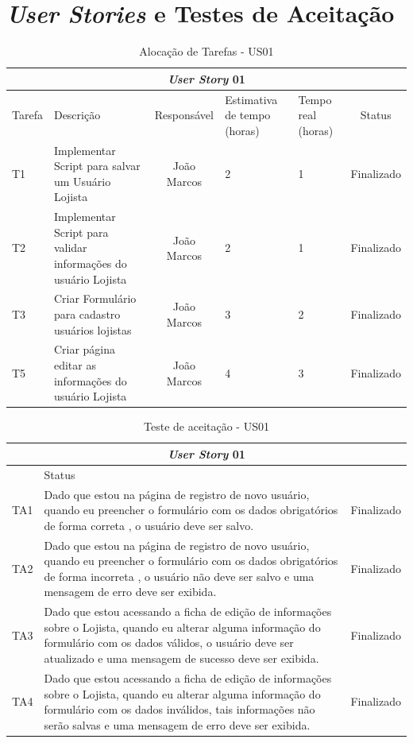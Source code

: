 \documentclass[a4paper,12pt]{monografia}
\begin{document}

\chapter{\textit{User Stories} e Testes de Aceitação} %
\label{app:user_stories_e_testes_de_aceitacao}

\begin{longtable}{|p{1.5cm}|p{3.5cm}|c|p{2cm}|p{2cm}|c|}
\caption{Alocação de Tarefas - US01}
\label{quadro:tat-us03}
\hline
\multicolumn{6}{|c|}{\textbf{\textit{User Story} 01}}\\
\hline		
\rowcolor{ballblue}
Tarefa & Descrição & Responsável & Estimativa de tempo (horas) & Tempo real (horas) & Status\\
\hline
T1 & Implementar Script para salvar um Usuário Lojista & João Marcos & 2 & 1 & Finalizado\\
\hline
T2 & Implementar Script para validar informações do usuário Lojista & João Marcos & 2 & 1 & Finalizado\\
\hline
T3 & Criar Formulário para cadastro usuários lojistas & João Marcos & 3 & 2 & Finalizado\\	
\hline
T5 & Criar página editar as informações do usuário Lojista & João Marcos & 4 & 3 & Finalizado\\	
\hline
\end{longtable}

\begin{longtable}{|l|p{11.8cm}|c|}
\caption{Teste de aceitação - US01}
\label{quadro:teste-aceitacao-us01}
\hline
\multicolumn{3}{|c|}{\textbf{\textit{User Story} 01}}\\
\hline		
\rowcolor{ballblue}
\multicolumn{2}{|c|}{Testes de aceitação} & Status\\	
\hline
TA1 & Dado que estou na página de registro de novo usuário, quando eu preencher o formulário com os dados obrigatórios de forma correta , o usuário deve ser salvo.   & Finalizado\\
\hline
TA2 & Dado que estou na página de registro de novo usuário, quando eu preencher o formulário com os dados obrigatórios de forma incorreta , o usuário não deve ser salvo e uma mensagem de erro deve ser exibida.   & Finalizado\\
\hline
TA3 & Dado que estou acessando a ficha de edição de informações sobre o Lojista, quando eu alterar alguma informação do formulário com os dados válidos, o usuário deve ser atualizado e uma mensagem de sucesso deve ser exibida.   & Finalizado\\
\hline
TA4 & Dado que estou acessando a ficha de edição de informações sobre o Lojista, quando eu alterar alguma informação do formulário com os dados inválidos, tais informações não serão salvas e uma mensagem de erro deve ser exibida.   & Finalizado\\
\hline	
\end{longtable}
\end{document}
